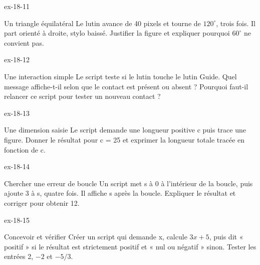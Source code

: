 \begin{blocLivre}{ex-18-11}\begin{exercice}[3]{Un triangle équilatéral}
Le lutin avance de 40 pixels et tourne de $120^\circ$, trois fois. Il part orienté à droite, stylo baissé. Justifier la figure et expliquer pourquoi $60^\circ$ ne convient pas.
\label{fig-ex-18-11}
\end{exercice}\end{blocLivre}
\begin{blocLivre}{ex-18-12}\begin{exercice}[3]{Une interaction simple}
Le script teste si le lutin touche le lutin Guide. Quel message affiche-t-il selon que le contact est présent ou absent ? Pourquoi faut-il relancer ce script pour tester un nouveau contact ?
\label{fig-ex-18-12}
\end{exercice}\end{blocLivre}
\begin{blocLivre}{ex-18-13}\begin{exercice}[3]{Une dimension saisie}
Le script demande une longueur positive c puis trace une figure. Donner le résultat pour c = 25 et exprimer la longueur totale tracée en fonction de c.
\label{fig-ex-18-13}
\end{exercice}\end{blocLivre}
\begin{blocLivre}{ex-18-14}\begin{exercice}[3]{Chercher une erreur de boucle}
Un script met s à 0 à l’intérieur de la boucle, puis ajoute 3 à s, quatre fois. Il affiche s après la boucle. Expliquer le résultat et corriger pour obtenir 12.
\label{fig-ex-18-14}
\end{exercice}\end{blocLivre}
\begin{blocLivre}{ex-18-15}\begin{exercice}[3]{Concevoir et vérifier}
Créer un script qui demande x, calcule $3x+5$, puis dit « positif » si le résultat est strictement positif et « nul ou négatif » sinon. Tester les entrées 2, $-2$ et $-5/3$.
\label{fig-ex-18-15}
\end{exercice}\end{blocLivre}

\clearpage
